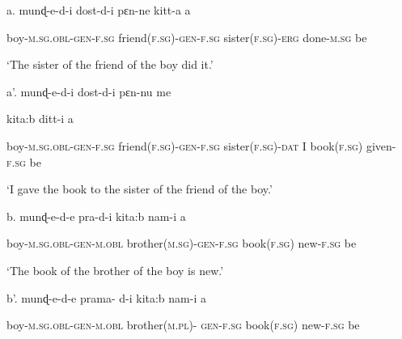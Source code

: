 \documentclass[output=paper]{langsci/langscibook}
\begin{document}
\begin{stylefootnotetext}
  a.  munɖ-e-d-i   dost-d-i   pɛn-ne    kitt-a         a  
\end{stylefootnotetext}

\begin{styleSfondomedioiColorexxi}
    boy-\textsc{m.sg.obl-gen-f.sg}  friend\textsc{(f.sg)-gen-f.sg}  sister\textsc{(f.sg)-erg}    done-\textsc{m.sg}   be
\end{styleSfondomedioiColorexxi}

\begin{styleSfondomedioiColorexxi}
    ‘The sister of the friend of the boy did it.’
\end{styleSfondomedioiColorexxi}

\begin{styleSfondomedioiColorexxi}
  a’.  munɖ-e-d-i    dost-d-i   pɛn-nu  me    
\end{styleSfondomedioiColorexxi}

\begin{styleSfondomedioiColorexxi}
    kita:b         ditt-i   a 
\end{styleSfondomedioiColorexxi}

\begin{stylefootnotetext}
    boy-\textsc{m.sg.obl-gen-f.sg}  friend\textsc{(f.sg)-gen-f.sg}  sister\textsc{(f.sg)-dat}   I          book\textsc{(f.sg)}   given\textsc{{}-f.sg}   be
\end{stylefootnotetext}

\begin{stylefootnotetext}
    ‘I gave the book to the sister of the friend of the boy.’
\end{stylefootnotetext}

  b.  munɖ-e-d-e   pra-d-i   kita:b   nam-i    a

\begin{stylefootnotetext}
    boy-\textsc{m.sg.obl-gen-m.obl}  brother\textsc{(m.sg)-gen-f.sg}  book\textsc{(f.sg)}   new-\textsc{f.sg} be 
\end{stylefootnotetext}

    ‘The book of the brother of the boy is new.’

  b’.  munɖ-e-d-e   prama-  d-i   kita:b   nam-i       a

\begin{stylefootnotetext}
    boy-\textsc{m.sg.obl-gen-m.obl}  brother\textsc{(m.pl)-  gen-f.sg}   book\textsc{(f.sg)}   new-\textsc{f.sg} be 
\end{stylefootnotetext}
\end{document}
